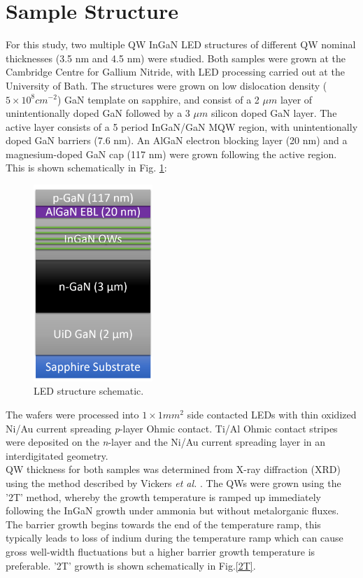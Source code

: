 \section{Sample Structure}
For this study, two multiple QW InGaN LED structures of different QW nominal thicknesses (3.5 nm and 4.5 nm) were studied. Both samples were grown at the Cambridge Centre for Gallium Nitride, with LED processing carried out at the University of Bath. The structures were grown on low dislocation density  ($5 \times 10^{8}cm^{-2}$) GaN template on sapphire, and consist of a 2 $\mu m$ layer of unintentionally doped GaN followed by a 3 $\mu m$ silicon doped GaN layer. The active layer consists of a 5 period InGaN/GaN MQW region, with unintentionally doped GaN barriers (7.6 nm). An AlGaN electron blocking layer  (20 nm) and a magnesium-doped GaN cap (117 nm) were grown following the active region. This is shown schematically in Fig. \ref{LEDstruct}:

\begin{figure}[!ht]
	\centering
	\includegraphics[width=0.4\textwidth]{Figs/Ch3/LEDstruct}
	\caption[h] {LED structure schematic.}
	\label{LEDstruct}
\end{figure}

\FloatBarrier 
The wafers were processed into $1 \times 1 mm^{2}$ side contacted LEDs with thin oxidized Ni/Au current spreading {\it p}-layer Ohmic contact. Ti/Al Ohmic contact stripes were deposited on the {\it n}-layer and the Ni/Au current spreading layer in an interdigitated geometry.\\
QW thickness for both samples was determined from X-ray diffraction  (XRD) using the method described by Vickers {\it et al.} \cite{Vickers2003}. The QWs were grown using the '2T' method, whereby the growth temperature is ramped up immediately following the InGaN growth under ammonia but without metalorganic fluxes. The barrier growth begins towards the end of the temperature ramp, this typically leads to loss of indium during the temperature ramp which can cause gross well-width fluctuations \cite{Laak2013} but a higher barrier growth temperature is preferable\cite{Oliver2013}. '2T' growth is shown schematically in Fig.\ref{2T}.

